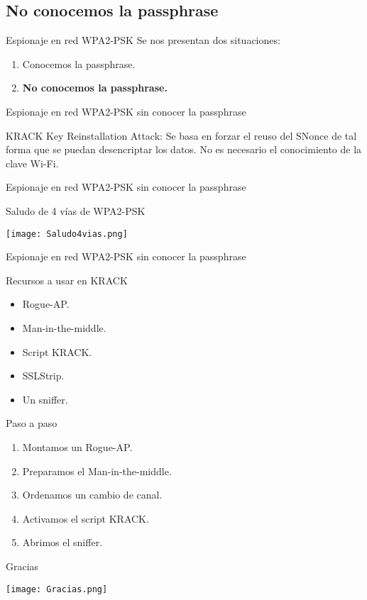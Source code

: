 \documentclass{beamer}
\begin{document}
\subsection{No conocemos la passphrase}
\begin{frame}{Espionaje en red WPA2-PSK}
Se nos presentan dos situaciones:
\begin{enumerate}
	\item Conocemos la passphrase.
	\item \textbf{{\large No conocemos la passphrase.}}
\end{enumerate}
\end{frame}

\begin{frame}{Espionaje en red WPA2-PSK sin conocer la passphrase}
\begin{block}{KRACK}
	Key Reinstallation Attack: Se basa en forzar el reuso del SNonce de tal forma que se puedan desencriptar los datos. No es necesario el conocimiento de la clave Wi-Fi.
\end{block}

\end{frame}

\begin{frame}{Espionaje en red WPA2-PSK sin conocer la passphrase}
\begin{block}{Saludo de 4 vías de WPA2-PSK}
	\begin{center}
		\texttt{[image: Saludo4vias.png]}
	\end{center}
\end{block}
\end{frame}


\begin{frame}{Espionaje en red WPA2-PSK sin conocer la passphrase}
\begin{block}{Recursos a usar en KRACK}
	\begin{itemize}
		\item Rogue-AP.
		\item Man-in-the-middle.
		\item Script KRACK.
		\item SSLStrip.
		\item Un sniffer.
		
	\end{itemize}
\end{block}
\begin{block}{Paso a paso}
\begin{enumerate}
	\item Montamos un Rogue-AP.
	\item Preparamos el Man-in-the-middle.
	\item Ordenamos un cambio de canal.
	\item Activamos el script KRACK.
	\item Abrimos el sniffer.
\end{enumerate}
\end{block}
\end{frame}

\begin{frame}{Gracias}
	\begin{center}
		\texttt{[image: Gracias.png]}
	\end{center}
\end{frame}
\end{document}
